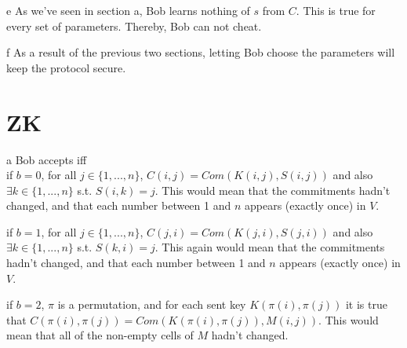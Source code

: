 \documentclass{article}
\begin{document}
\begin{paragraph}
    e As we've seen in section a, Bob learns nothing of $s$ from $C$. This is true for every set of parameters. Thereby, Bob
    can not cheat.
\end{paragraph}

\begin{paragraph}
    f As a result of the previous two sections, letting Bob choose the parameters will keep the protocol secure.
\end{paragraph}

\section{ZK}
\begin{paragraph}
    a Bob accepts iff\\
    
    \quad if \(b = 0\), for all \(j \in \{1, ..., n\}\), \(C(i, j) = Com(K(i, j), S(i, j))\) and also \(\exists k \in \{1, ..., n\}\) s.t. \(S(i, k) = j\). This would mean that the commitments hadn't changed, and that each number between 1 and \(n\) appears (exactly once) in \(V\).
    
    \quad if \(b = 1\), for all \(j \in \{1, ..., n\}\), \(C(j, i) = Com(K(j, i), S(j, i))\) and also \(\exists k \in \{1, ..., n\}\) s.t. \(S(k, i) = j\). This again would mean that the commitments hadn't changed, and that each number between 1 and \(n\) appears (exactly once) in \(V\).
    
    \quad if \(b = 2\), \(\pi\) is a permutation, and for each sent key \(K(\pi(i), \pi(j))\) it is true that \(C(\pi(i), \pi(j)) = Com(K(\pi(i), \pi(j)), M(i, j))\). This would mean that all of the non-empty cells of \(M\) hadn't changed.
\end{paragraph}
\end{document}
